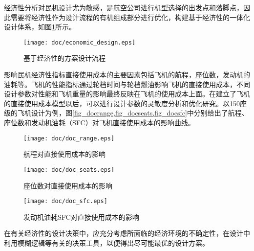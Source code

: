 经济性分析对民机设计尤为敏感，是航空公司进行机型选择的出发点和落脚点，因此需要将经济性作为设计流程的有机组成部分进行优化，构建基于经济性的一体化设计体系，如图\ref{fig_economic_design}所示。%
\begin{figure}
\begin{center}
  \texttt{[image: doc/economic\_design.eps]}
  \caption{基于经济性的方案设计流程}
  \label{fig_economic_design}
\end{center}
\end{figure}
影响民机经济性指标直接使用成本的主要因素包括飞机的航程，座位数，发动机的油耗等。飞机的性能指标通过轮档时间与轮档燃油影响飞机的直接使用成本，不同设计参数对性能和飞机重量的影响最终反映在飞机的使用成本上面。在建立了飞机的直接使用成本模型以后，可以进行设计参数的灵敏度分析和优化研究。以150座级的飞机设计为例，图\ref{fig_docrange,fig_docseats,fig_docsfc}中分别给出了航程、
座位数和发动机油耗（SFC）对飞机直接使用成本的影响曲线。%
\begin{figure}
\begin{center}
  \texttt{[image: doc/doc\_range.eps]}
  \caption{航程对直接使用成本的影响}
  \label{fig_docrange}
\end{center}
\end{figure}
\begin{figure}
\begin{center}
  \texttt{[image: doc/doc\_seats.eps]}
  \caption{座位数对直接使用成本的影响}
  \label{fig_docseats}
\end{center}
\end{figure}
\begin{figure}
\begin{center}
  \texttt{[image: doc/doc\_sfc.eps]}
  \caption{发动机油耗SFC对直接使用成本的影响}
  \label{fig_docsfc}
\end{center}
\end{figure}

在有关经济性的设计决策中，应充分考虑所面临的经济环境的不确定性，在设计中利用模糊逻辑等有关的决策工具，以便得出尽可能最优的设计方案。
